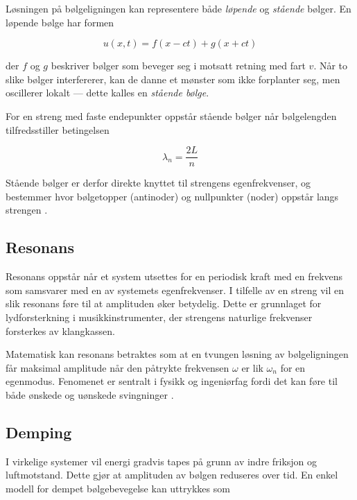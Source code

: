 Løsningen på bølgeligningen kan representere både \textit{løpende} og \textit{stående} bølger.  
En løpende bølge har formen

\begin{equation*}
u(x,t) = f(x - ct) + g(x + ct)
\end{equation*}

der $f$ og $g$ beskriver bølger som beveger seg i motsatt retning med fart $v$.  
Når to slike bølger interfererer, kan de danne et mønster som ikke forplanter seg, men oscillerer lokalt — dette kalles en \textit{stående bølge}.  

For en streng med faste endepunkter oppstår stående bølger når bølgelengden tilfredsstiller betingelsen

\begin{equation*}
\lambda_n = \frac{2L}{n}
\end{equation*}

Stående bølger er derfor direkte knyttet til strengens egenfrekvenser, og bestemmer hvor bølgetopper (antinoder) og nullpunkter (noder) oppstår langs strengen \parencite{libretextsStandingWaves}.

\subsection{Resonans}

Resonans oppstår når et system utsettes for en periodisk kraft med en frekvens som samsvarer med en av systemets egenfrekvenser.  
I tilfelle av en streng vil en slik resonans føre til at amplituden øker betydelig.  
Dette er grunnlaget for lydforsterkning i musikkinstrumenter, der strengens naturlige frekvenser forsterkes av klangkassen.  

Matematisk kan resonans betraktes som at en tvungen løsning av bølgeligningen får maksimal amplitude når den påtrykte frekvensen $\omega$ er lik $\omega_n$ for en egenmodus.  
Fenomenet er sentralt i fysikk og ingeniørfag fordi det kan føre til både ønskede og uønskede svingninger \parencite{libretextsStringResonance}.

\subsection{Demping}

I virkelige systemer vil energi gradvis tapes på grunn av indre friksjon og luftmotstand.  
Dette gjør at amplituden av bølgen reduseres over tid.  
En enkel modell for dempet bølgebevegelse kan uttrykkes som


